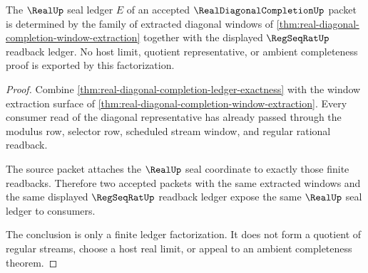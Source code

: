 \begin{theorem}
\label{thm:real-diagonal-completion-seal-factorization}
The $\RealUp$ seal ledger $E$ of an accepted $\RealDiagonalCompletionUp$ packet is determined by the family of extracted diagonal windows of \autoref{thm:real-diagonal-completion-window-extraction} together with the displayed $\RegSeqRatUp$ readback ledger. No host limit, quotient representative, or ambient completeness proof is exported by this factorization.
\end{theorem}
\begin{proof}
Combine \autoref{thm:real-diagonal-completion-ledger-exactness} with the window extraction surface of \autoref{thm:real-diagonal-completion-window-extraction}. Every consumer read of the diagonal representative has already passed through the modulus row, selector row, scheduled stream window, and regular rational readback.

The source packet attaches the $\RealUp$ seal coordinate to exactly those finite readbacks. Therefore two accepted packets with the same extracted windows and the same displayed $\RegSeqRatUp$ readback ledger expose the same $\RealUp$ seal ledger to consumers.

The conclusion is only a finite ledger factorization. It does not form a quotient of regular streams, choose a host real limit, or appeal to an ambient completeness theorem.
\end{proof}

